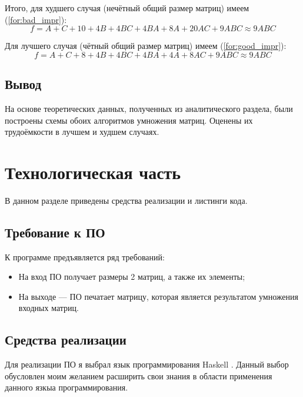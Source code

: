 \documentclass[12pt]{report}
\begin{document}
Итого, для худшего случая (нечётный общий размер матриц) имеем (\ref{for:bad_impr}):
\begin{equation}
\label{for:bad_impr}
f = A + C + 10 + 4B + 4BC + 4BA + 8A + 20AC + 9ABC \approx 9ABC
\end{equation}

Для лучшего случая (чётный общий размер матриц) имеем (\ref{for:good_impr}):
\begin{equation}
\label{for:good_impr}
f = A + C + 8 + 4B +4BC + 4BA + 4A + 8AC + 9ABC \approx 9ABC
\end{equation}

\section{Вывод}
	На основе теоретических данных, полученных из аналитического раздела, были построены схемы обоих алгоритмов умножения матриц.  Оценены их трудоёмкости в лучшем и худшем случаях.

\chapter{Технологическая часть}

В данном разделе приведены средства реализации и листинги кода.

\section{Требование к ПО}

К программе предъявляется ряд требований:

\begin{itemize}

	\item На вход ПО получает размеры 2 матриц, а также их элементы;

	\item На выходе — ПО печатает матрицу, которая является результатом умножения входных матриц.

\end{itemize}

\section{Средства реализации}
Для реализации ПО я выбрал язык программирования Haskell \cite{Haskell}. Данный выбор обусловлен моим желанием расширить свои знания в области применения данного язкыа программирования. 
\end{document}
